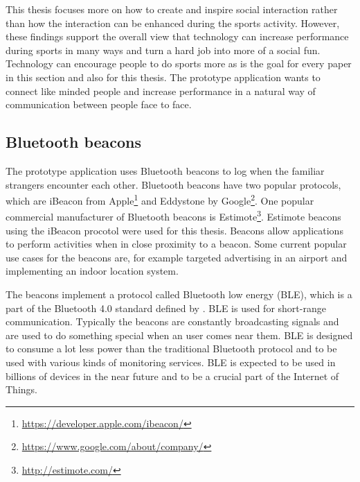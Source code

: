 This thesis focuses more on how to create and inspire social interaction rather than how the interaction can be enhanced during the sports activity. However, these findings support the overall view that technology can increase performance during sports in many ways and turn a hard job into more of a social fun. Technology can encourage people to do sports more as is the goal for every paper in this section and also for this thesis. The prototype application wants to connect like minded people and increase performance in a natural way of communication between people face to face. 

\subsection{Bluetooth beacons}

The prototype application uses Bluetooth beacons to log when the familiar strangers encounter each other. Bluetooth beacons have two popular protocols, which are iBeacon from Apple\footnote{\url{https://developer.apple.com/ibeacon/}} and Eddystone by Google\footnote{\url{https://www.google.com/about/company/}}. One popular commercial manufacturer of Bluetooth beacons is Estimote\footnote{\url{http://estimote.com/}}. Estimote beacons using the iBeacon procotol were used for this thesis. Beacons allow applications to perform activities when in close proximity to a beacon. Some current popular use cases for the beacons are, for example targeted advertising in an airport and implementing an indoor location system.

The beacons implement a protocol called Bluetooth low energy (BLE), which is a part of the Bluetooth 4.0 standard defined by \cite{bluetooth}. BLE is used for short-range communication. Typically the beacons are constantly broadcasting signals and are used to do something special when an user comes near them. BLE is designed to consume a lot less power than the traditional Bluetooth protocol and to be used with various kinds of monitoring services. BLE is expected to be used in billions of devices in the near future and to be a crucial part of the Internet of Things\citep{bluetoothOverview}.


